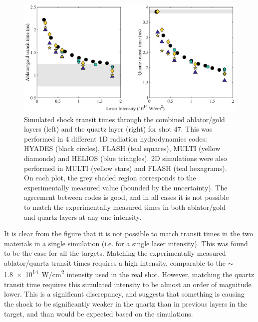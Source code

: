 \begin{figure} [h!]
\begin{centering}
\includegraphics{figures/Experiment/SimulationVertical_edit.eps}%
\caption{\label{fig:SimulationPlot} Simulated shock transit times through the combined ablator/gold layers (left) and the quartz layer (right) for shot 47. This was performed in 4 different 1D radiation hydrodynamics codes: HYADES (black circles), FLASH (teal squares), MULTI (yellow diamonds) and HELIOS (blue triangles). 2D simulations were also performed in MULTI (yellow stars) and FLASH (teal hexagrams). On each plot, the grey shaded region corresponds to the experimentally measured value (bounded by the uncertainty). The agreement between codes is good, and in all cases it is not possible to match the experimentally measured times in both ablator/gold and quartz layers at any one intensity.}
\end{centering}
\end{figure}

It is clear from the figure that it is not possible to match transit times in the two materials in a single simulation (i.e. for a single laser intensity). This was found to be the case for all the targets. Matching the experimentally measured ablator/quartz transit times requires a high intensity, comparable to the $\sim$\num{1.8e14}~\si[per-mode=symbol]{W/cm^2} intensity used in the real shot. However, matching the quartz transit time requires this simulated intensity to be almost an order of magnitude lower. This is a significant discrepancy, and suggests that something is causing the shock to be significantly weaker in the quartz than in previous layers in the target, and than would be expected based on the simulations. 

